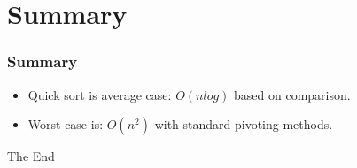 \documentclass{beamer}
\begin{document}
\section{Summary}
\begin{frame}
\frametitle{Summary}
\begin{itemize}
\item Quick sort is average case: $O(nlog)$ based on comparison.
\item Worst case is: $O(n^2)$ with standard pivoting methods.
\end{itemize}
\end{frame}
\begin{frame} 
\Huge{\centerline{The End}}
\end{frame}
\end{document}
